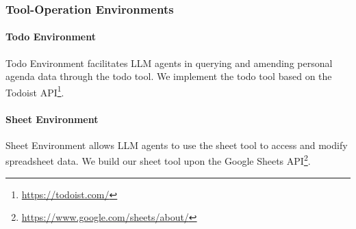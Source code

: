 \subsubsection{Tool-Operation Environments}
\label{appendix.a.3}
\paragraph{Todo Environment}
Todo Environment facilitates LLM agents in querying and amending personal agenda data through the todo tool.
We implement the todo tool based on the Todoist API\footnote{\url{https://todoist.com/}}.

\paragraph{Sheet Environment}
Sheet Environment allows LLM agents to use the sheet tool to access and modify spreadsheet data.
We build our sheet tool upon the Google Sheets API\footnote{\url{https://www.google.com/sheets/about/}}.
